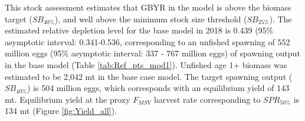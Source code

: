\documentclass[12pt,]{article}
\begin{document}
This stock assessment estimates that GBYR in the model is above the
biomass target (\(SB_{40\%}\)), and well above the minimum stock size
threshold (\(SB_{25\%}\)). The estimated relative depletion level for
the base model in 2018 is 0.439 (95\% asymptotic interval: 0.341-0.536,
corresponding to an unfished spawning of 552 million eggs (95\%
asymptotic interval: 337 - 767 million eggs) of spawning output in the
base model (Table \ref{tab:Ref_pts_mod1}). Unfished age 1+ biomass was
estimated to be 2,042 mt in the base case model. The target spawning
output (\(SB_{40\%}\)) is 504 million eggs, which corresponds with an
equilibrium yield of 143 mt. Equilibrium yield at the proxy \(F_{MSY}\)
harvest rate corresponding to \(SPR_{50\%}\) is 134 mt (Figure
\ref{fig:Yield_all}).

\FloatBarrier
\end{document}
